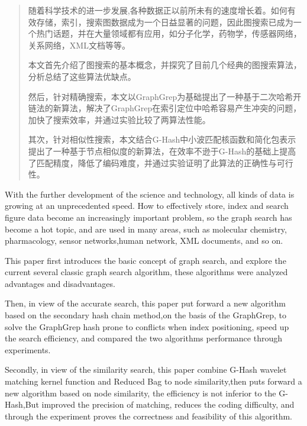 \documentclass{XDBAthesis}
\begin{document}
\else
\fi
\begin{abstract}
    随着科学技术的进一步发展,各种数据正以前所未有的速度增长着。如何有效存储，索引，搜索图数据成为一个日益显著的问题，因此图搜索已成为一个热门话题，并在大量领域都有应用，如分子化学，药物学，传感器网络，关系网络，XML文档等等。
    
    本文首先介绍了图搜索的基本概念，并探究了目前几个经典的图搜索算法，分析总结了这些算法优缺点。
    
    然后，针对精确搜索，本文以GraphGrep为基础提出了一种基于二次哈希开链法的新算法，解决了GraphGrep在索引定位中哈希容易产生冲突的问题，加快了搜索效率，并通过实验比较了两算法性能。
    
    其次，针对相似性搜索，本文结合G-Hash中小波匹配核函数和简化包表示提出了一种基于节点相似度的新算法，在效率不逊于G-Hash的基础上提高了匹配精度，降低了编码难度，并通过实验证明了此算法的正确性与可行性。
    
    
\end{abstract}
\begin{englishabstract}
With the further development of the science and technology, all kinds of data is growing at an unprecedented speed. How to effectively store, index and search figure data become an increasingly important problem, so the graph search has become a hot topic, and are used in many areas, such as molecular chemistry, pharmacology, sensor networks,human network, XML documents, and so on.

This paper first introduces the basic concept of graph search, and explore the current several classic graph search algorithm, these algorithms were analyzed advantages and disadvantages.

Then, in view of the accurate search, this paper put forward a new algorithm based on the secondary hash chain method,on the basis of the GraphGrep, to solve the GraphGrep hash prone to conflicts when index positioning, speed up the search efficiency, and compared the two algorithms performance through experiments.

Secondly, in view of the similarity search, this paper combine G-Hash wavelet matching kernel function and Reduced Bag to node similarity,then puts forward a new algorithm based on node similarity, the efficiency is not inferior to the G-Hash,But improved the precision of matching, reduces the coding difficulty, and through the experiment proves the correctness and feasibility of this algorithm.

\end{englishabstract}



\ifx\allfiles\undefined
%
%
\end{document}
